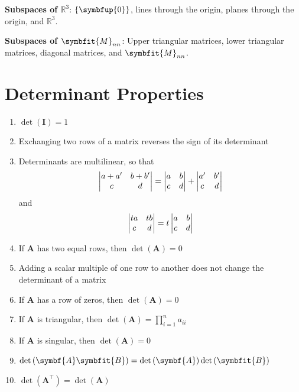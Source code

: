 \documentclass{article}
\begin{document}
\begin{multicols*}{2}
    \textbf{Subspaces of \(\mathbb{R}^3\)}: \(\left\{ \symbfup{0} \right\}\),
    lines through the origin, planes through the origin, and \(\mathbb{R}^3\).

    \textbf{Subspaces of \(\symbfit{M}_{nn}\)}: Upper triangular matrices,
    lower triangular matrices, diagonal matrices, and \(\symbfit{M}_{nn}\).
    \section*{Determinant Properties}
    \begin{enumerate}
        \item \(\det{\left( \symbf{I} \right)}=1\)
        \item Exchanging two rows of a matrix reverses the sign of its determinant
        \item Determinants are multilinear, so that
              \begin{equation*}
                  \mdet{a+a' & b+b' \\ c & d}
                  = \mdet{a & b \\ c & d}+\mdet{a' & b' \\ c & d}
              \end{equation*}
              and
              \begin{equation*}
                  \mdet{ta & tb \\ c & d}=t\mdet{a & b \\ c & d}
              \end{equation*}
        \item If \(\symbf{A}\) has two equal rows, then \(\det{\left( \symbf{A} \right)}=0\)
        \item Adding a scalar multiple of one row to another does not change the determinant of a matrix
        \item If \(\symbf{A}\) has a row of zeros, then \(\det{\left( \symbf{A} \right)}=0\)
        \item If \(\symbf{A}\) is triangular, then \(\det{\left( \symbf{A} \right)}=\prod_{i=1}^{n} a_{ii}\)
        \item If \(\symbf{A}\) is singular, then \(\det{\left( \symbf{A} \right)}=0\)
        \item \(\det{\left( \symbf{A}\symbfit{B} \right)} = \det{\left( \symbf{A} \right)}\det{\left( \symbfit{B} \right)}\)
        \item \(\det{\left( \symbf{A}^\top \right)} = \det{\left( \symbf{A} \right)}\)
    \end{enumerate}

\end{multicols*}
\end{document}
